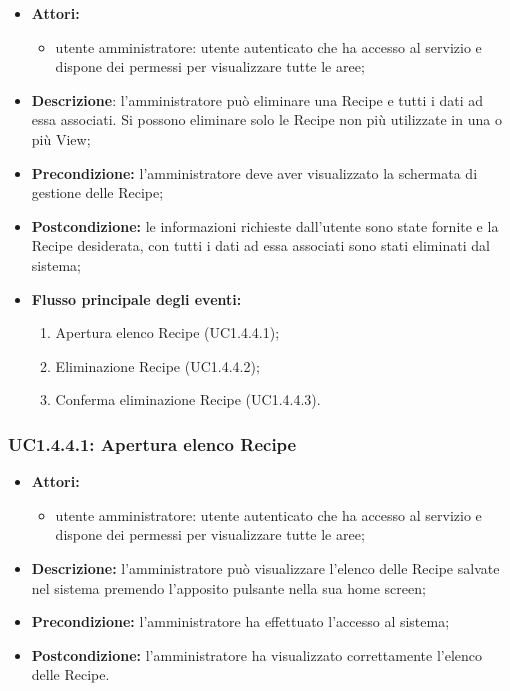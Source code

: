 \begin{itemize}
	\item \textbf{Attori:}
	\begin{itemize}
		\item utente amministratore: utente autenticato che ha accesso al servizio e dispone dei permessi per visualizzare tutte le aree;
	\end{itemize}
	\item \textbf{Descrizione}: l'amministratore può eliminare una Recipe e tutti i dati ad essa associati.
	Si possono eliminare solo le Recipe non più utilizzate in una o più View;
	\item \textbf{Precondizione:} l'amministratore deve aver visualizzato la schermata di gestione delle Recipe;
	\item \textbf{Postcondizione:} le informazioni richieste dall'utente sono state fornite e la Recipe desiderata, con tutti i dati ad essa associati sono stati eliminati dal sistema;
	\item \textbf{Flusso principale degli eventi:}
	\begin{enumerate}
		\item Apertura elenco Recipe (UC1.4.4.1);
		\item Eliminazione Recipe (UC1.4.4.2);
		\item Conferma eliminazione Recipe (UC1.4.4.3).
	\end{enumerate}
\end{itemize}

\subsubsection{UC1.4.4.1: Apertura elenco Recipe}

\begin{itemize}
	\item \textbf{Attori:}
	\begin{itemize}
		\item utente amministratore: utente autenticato che ha accesso al servizio e dispone dei permessi per visualizzare tutte le aree;
	\end{itemize}
	\item \textbf{Descrizione:} l'amministratore può visualizzare l'elenco delle Recipe salvate nel sistema premendo l'apposito pulsante nella sua home screen;
	\item \textbf{Precondizione:} l'amministratore ha effettuato l'accesso al sistema;
	\item \textbf{Postcondizione:} l'amministratore ha visualizzato correttamente l'elenco delle Recipe.
\end{itemize}

